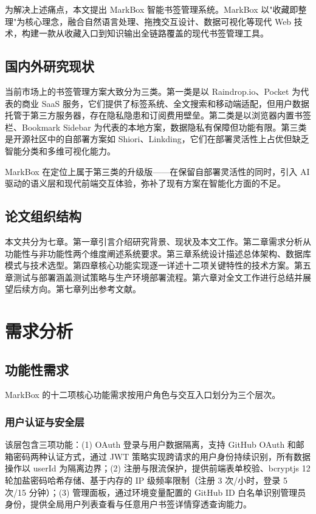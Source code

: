 \documentclass[a4paper,12pt]{ctexart}
\begin{document}
为解决上述痛点，本文提出 MarkBox 智能书签管理系统。MarkBox 以"收藏即整理"为核心理念，融合自然语言处理、拖拽交互设计、数据可视化等现代 Web 技术，构建一款从收藏入口到知识输出全链路覆盖的现代书签管理工具。

\subsection{国内外研究现状}

当前市场上的书签管理方案大致分为三类。第一类是以 Raindrop.io、Pocket 为代表的商业 SaaS 服务，它们提供了标签系统、全文搜索和移动端适配，但用户数据托管于第三方服务器，存在隐私隐患和订阅费用壁垒。第二类是以浏览器内置书签栏、Bookmark Sidebar 为代表的本地方案，数据隐私有保障但功能有限。第三类是开源社区中的自部署方案如 Shiori、Linkding，它们在部署灵活性上占优但缺乏智能分类和多维可视化能力。

MarkBox 在定位上属于第三类的升级版——在保留自部署灵活性的同时，引入 AI 驱动的语义层和现代前端交互体验，弥补了现有方案在智能化方面的不足。

\subsection{论文组织结构}

本文共分为七章。第一章引言介绍研究背景、现状及本文工作。第二章需求分析从功能性与非功能性两个维度阐述系统要求。第三章系统设计描述总体架构、数据库模式与技术选型。第四章核心功能实现逐一详述十二项关键特性的技术方案。第五章测试与部署涵盖测试策略与生产环境部署流程。第六章对全文工作进行总结并展望后续方向。第七章列出参考文献。

\section{需求分析}

\subsection{功能性需求}

MarkBox 的十二项核心功能需求按用户角色与交互入口划分为三个层次。

\subsubsection{用户认证与安全层}

该层包含三项功能：(1) OAuth 登录与用户数据隔离，支持 GitHub OAuth 和邮箱密码两种认证方式，通过 JWT 策略实现跨请求的用户身份持续识别，所有数据操作以 userId 为隔离边界；(2) 注册与限流保护，提供前端表单校验、bcryptjs 12 轮加盐密码哈希存储、基于内存的 IP 级频率限制（注册 3 次/小时，登录 5 次/15 分钟）；(3) 管理面板，通过环境变量配置的 GitHub ID 白名单识别管理员身份，提供全局用户列表查看与任意用户书签详情穿透查询能力。
\end{document}

